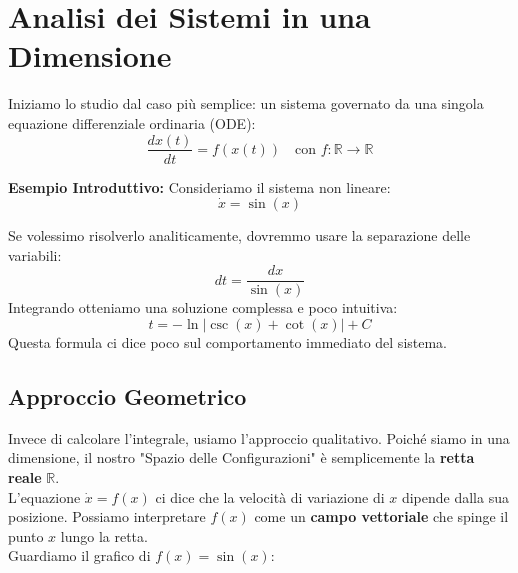\documentclass[openany]{book}
\theoremstyle{definition}
\theoremstyle{remark}
\begin{document}
\section{Analisi dei Sistemi in una Dimensione}
Iniziamo lo studio dal caso più semplice: un sistema governato da una singola equazione differenziale ordinaria (ODE):
\[
    \frac{dx(t)}{dt} = f(x(t)) \quad \text{con } f: \mathbb{R} \to \mathbb{R}
\]

\textbf{Esempio Introduttivo:}
Consideriamo il sistema non lineare:
\[ \dot{x} = \sin(x) \]

Se volessimo risolverlo analiticamente, dovremmo usare la separazione delle variabili:
\[ dt = \frac{dx}{\sin(x)} \]
Integrando otteniamo una soluzione complessa e poco intuitiva:
\[ t = -\ln \left| \csc(x) + \cot(x) \right| + C \]
Questa formula ci dice poco sul comportamento immediato del sistema.

\subsection{Approccio Geometrico}

Invece di calcolare l'integrale, usiamo l'approccio qualitativo. Poiché siamo in una dimensione, il nostro "Spazio delle Configurazioni" è semplicemente la \textbf{retta reale} $\mathbb{R}$.
\\
L'equazione $\dot{x} = f(x)$ ci dice che la velocità di variazione di $x$ dipende dalla sua posizione. Possiamo interpretare $f(x)$ come un \textbf{campo vettoriale} che spinge il punto $x$ lungo la retta.
\\
Guardiamo il grafico di $f(x) = \sin(x)$:
\end{document}

